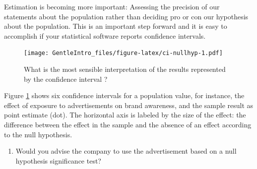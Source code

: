 \documentclass[a4paper]{book}
\newenvironment{Shaded}{\begin{snugshade}}{\end{snugshade}}
\newcommand{\KeywordTok}[1]{\textcolor[rgb]{0,0,0}{\textbf{#1}}}
\newcommand{\DecValTok}[1]{\textcolor[rgb]{0.00,0.00,0.00}{#1}}
\newcommand{\StringTok}[1]{\textcolor[rgb]{0.00,0.00,0.00}{#1}}
\newcommand{\ControlFlowTok}[1]{\textcolor[rgb]{0.00,0.00,0.00}{\textbf{#1}}}
\newcommand{\OperatorTok}[1]{\textcolor[rgb]{0.00,0.00,0.00}{\textbf{#1}}}
\newcommand{\NormalTok}[1]{#1}
\providecommand{\tightlist}{%
  \setlength{\itemsep}{0pt}\setlength{\parskip}{0pt}}
\theoremstyle{definition}
\theoremstyle{definition}
\theoremstyle{definition}
\theoremstyle{remark}
\begin{document}
Estimation is becoming more important: Assessing the precision of our
statements about the population rather than deciding pro or con our
hypothesis about the population. This is an important step forward and
it is easy to accomplish if your statistical software reports confidence
intervals.

\begin{figure}[H]
\centering
\texttt{[image: GentleIntro\_files/figure-latex/ci-nullhyp-1.pdf]}
\caption{\label{fig:ci-nullhyp}What is the most sensible interpretation of
the results represented by the confidence interval ?}
\end{figure}

Figure \ref{fig:ci-nullhyp} shows six confidence intervals for a
population value, for instance, the effect of exposure to advertisements
on brand awareness, and the sample result as point estimate (dot). The
horizontal axis is labeled by the size of the effect: the difference
between the effect in the sample and the absence of an effect according
to the null hypothesis.

\begin{enumerate}
\def\labelenumi{\arabic{enumi}.}
\tightlist
\item
  Would you advise the company to use the advertisement based on a null
  hypothesis significance test?
\end{enumerate}

\begin{Shaded}
\end{Shaded}
\end{document}
